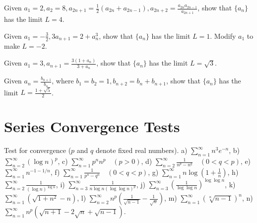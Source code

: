     \begin{problembox}
    Given \(a_1 = 2, a_2 = 8, a_{2n+1} = \frac{1}{2}(a_{2n} + a_{2n-1}), a_{2n+2} = \frac{a_{2n} a_{2n-1}}{a_{2n+1}}\), show that \(\{a_n\}\) has the limit \(L = 4\).
    \end{problembox}
    
    \begin{problembox}
    Given \(a_1 = -\frac{3}{2}, 3a_{n+1} = 2 + a_n^3\), show that \(\{a_n\}\) has the limit \(L = 1\). Modify \(a_1\) to make \(L = -2\).
    \end{problembox}
    
    \begin{problembox}
    Given \(a_1 = 3, a_{n+1} = \frac{3(1 + a_n)}{3 + a_n}\), show that \(\{a_n\}\) has the limit \(L = \sqrt{3}\).
    \end{problembox}
    
    \begin{problembox}
    Given \(a_n = \frac{b_{n+1}}{b_n}\), where \(b_1 = b_2 = 1, b_{n+2} = b_n + b_{n+1}\), show that \(\{a_n\}\) has the limit \(L = \frac{1 + \sqrt{5}}{2}\).
    \end{problembox}

\section{Series Convergence Tests}

\begin{problembox}
    Test for convergence (\(p\) and \(q\) denote fixed real numbers).
    a) \(\sum_{n=1}^{\infty} n^3 e^{-n}\),    b) \(\sum_{n=2}^{\infty} (\log n)^p\), 
    c) \(\sum_{n=1}^{\infty} p^n n^p \quad (p > 0)\),    d) \(\sum_{n=2}^{\infty} \frac{1}{n^p - n^q} \quad (0 < q < p)\),
    e) \(\sum_{n=1}^{\infty} n^{-1-1/n}\),    f) \(\sum_{n=1}^{\infty} \frac{1}{p^n - q^n} \quad (0 < q < p)\),
    g) \(\sum_{n=1}^{\infty} n \log \left(1 + \frac{1}{n}\right)\),    h) \(\sum_{n=2}^{\infty} \frac{1}{(\log n)^{\log n}}\),
    i) \(\sum_{n=3}^{\infty} \frac{1}{n \log n (\log \log n)^p}\),    j) \(\sum_{n=3}^{\infty} \left( \frac{1}{\log \log n} \right)^{\log \log n}\),
    k) \(\sum_{n=1}^{\infty} (\sqrt{1 + n^2} - n)\),    l) \(\sum_{n=2}^{\infty} n^p \left( \frac{1}{\sqrt{n - 1}} - \frac{1}{\sqrt{n}} \right)\),
    m) \(\sum_{n=1}^{\infty} (\sqrt[n]{n - 1})^n\),    n) \(\sum_{n=1}^{\infty} n^p (\sqrt{n + 1} - 2\sqrt{n} + \sqrt{n - 1})\).
    \end{problembox}
    
